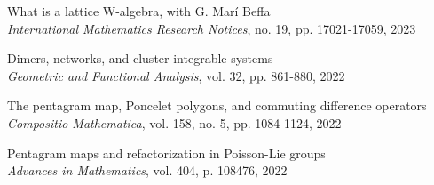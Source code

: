 \documentclass[a4paper, 12pt]{article}
\begin{document}
\begin{compactenum}
  \item {What is a lattice W-algebra}, with G. Mar\'i Beffa		\\\textit{International Mathematics Research Notices},  no. 19,  pp. 17021-17059, 2023
 
  \item {Dimers, networks, and cluster integrable systems}\\\textit{Geometric and Functional Analysis}, vol. 32, pp. 861-880, 2022

 \item {The pentagram map, Poncelet polygons, and commuting difference operators}\\\textit{Compositio Mathematica},  vol. 158, no. 5, pp. 1084-1124, 2022
 \item {Pentagram maps and refactorization in Poisson-Lie groups}\\\textit{Advances in Mathematics}, vol. 404, 
p. 108476,  2022


\end{compactenum}
\end{document}
